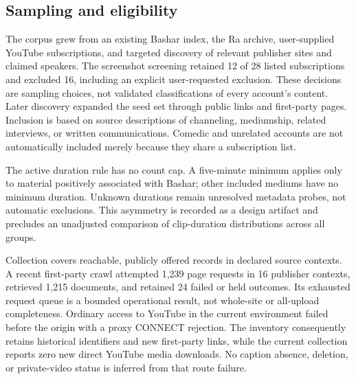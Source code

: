 \subsection{Sampling and eligibility}
The corpus grew from an existing Bashar index, the Ra archive, user-supplied YouTube subscriptions, and targeted discovery of relevant publisher sites and claimed speakers. The screenshot screening retained 12 of 28 listed subscriptions and excluded 16, including an explicit user-requested exclusion. These decisions are sampling choices, not validated classifications of every account's content. Later discovery expanded the seed set through public links and first-party pages. Inclusion is based on source descriptions of channeling, mediumship, related interviews, or written communications. Comedic and unrelated accounts are not automatically included merely because they share a subscription list.

The active duration rule has no count cap. A five-minute minimum applies only to material positively associated with Bashar; other included mediums have no minimum duration. Unknown durations remain unresolved metadata probes, not automatic exclusions. This asymmetry is recorded as a design artifact and precludes an unadjusted comparison of clip-duration distributions across all groups.

Collection covers reachable, publicly offered records in declared source contexts. A recent first-party crawl attempted 1,239 page requests in 16 publisher contexts, retrieved 1,215 documents, and retained 24 failed or held outcomes. Its exhausted request queue is a bounded operational result, not whole-site or all-upload completeness. Ordinary access to YouTube in the current environment failed before the origin with a proxy CONNECT rejection. The inventory consequently retains historical identifiers and new first-party links, while the current collection reports zero new direct YouTube media downloads. No caption absence, deletion, or private-video status is inferred from that route failure.

